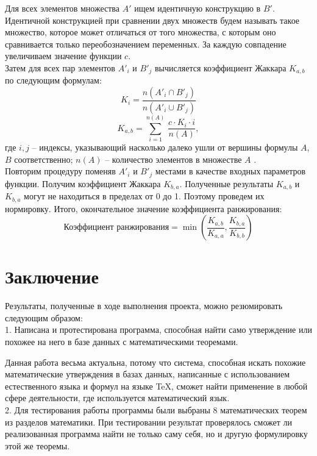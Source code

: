 \documentclass[12pt]{article}
\begin{document}
Для всех элементов множества $A'$ ищем идентичную конструкцию в $B'$. Идентичной конструкцией при сравнении двух множеств будем называть такое множество, которое может отличаться от того множества, с которым оно сравнивается только переобозначением переменных. За каждую совпадение увеличиваем значение функции $c$. \\

Затем для всех пар элементов $A'_{i}$ и $B'_{j}$ вычисляется коэффициент Жаккара $K_{a,b}$ по следующим формулам:
$$K_i=\dfrac{n(A'_{i} \cap B'_{j})}{n(A'_{i} \cup B'_{j})} $$
$$K_{a,b}= \sum \limits_{i=1}^{n(A)}\, \dfrac{c\cdot K_i \cdot i}{n(A)},$$  где $i,j$  --  индексы, указывающий насколько далеко ушли от вершины формулы $A$,$B$ соответственно; $n(A)$ -- количество элементов в множестве $A$ . \\

Повторим процедуру поменяв $A'_{i}$ и $B'_{j}$ местами в качестве входных параметров функции. Получим коэффициент Жаккара $K_{b,a}$. Полученные результаты  $K_{a,b}$ и $K_{b,a}$ могут не находиться в пределах от 0 до 1. Поэтому проведем их нормировку. Итого, окончательное значение коэффициента ранжирования:
$$\text{Коэффициент ранжирования}=\min \left (\dfrac{K_{a,b}}{K_{a,a}}, \dfrac{K_{b,a}}{K_{b,b}} \right )$$


\newpage
\section*{Заключение}
Результаты, полученные в ходе выполнения проекта, можно резюмировать следующим образом: \\

1. Написана и протестирована программа, способная найти само утверждение или похожее на него в базе данных с математическими теоремами.\vskip 0.3cm

Данная работа весьма актуальна, потому что система, способная искать похожие математические утверждения в базах данных, написанные с использованием естественного языка и формул на языке TeX, сможет найти применение в любой сфере деятельности, где используется математический язык.  \\

2. Для тестирования работы программы были выбраны 8 математических теорем из разделов математики. При тестировании результат проверялось сможет ли реализованная программа найти не только саму себя, но и другую формулировку этой же теоремы. \\
\end{document}
